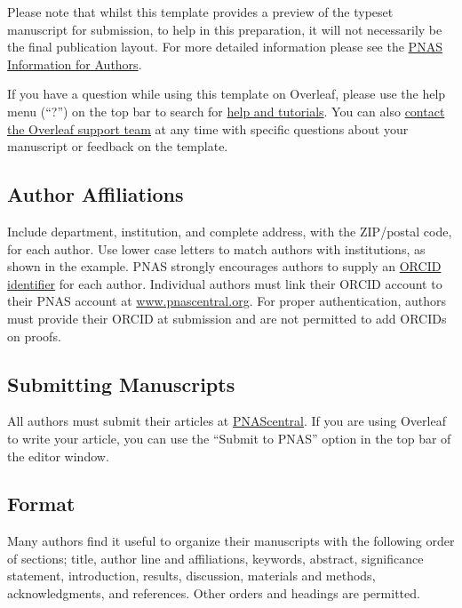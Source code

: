 \documentclass[9pt,twocolumn,twoside,lineno]{pnas-new}
\begin{document}
Please note that whilst this template provides a preview of the typeset manuscript for submission, to help in this preparation, it will not necessarily be the final publication layout. For more detailed information please see the \href{https://www.pnas.org/page/authors/format}{PNAS Information for Authors}.

If you have a question while using this template on Overleaf, please use the help menu (``?'') on the top bar to search for \href{https://www.overleaf.com/help}{help and tutorials}. You can also \href{https://www.overleaf.com/contact}{contact the Overleaf support team} at any time with specific questions about your manuscript or feedback on the template.

\subsection*{Author Affiliations}

Include department, institution, and complete address, with the ZIP/postal code, for each author. Use lower case letters to match authors with institutions, as shown in the example. PNAS strongly encourages authors to supply an \href{https://orcid.org/}{ORCID identifier} for each author. Individual authors must link their ORCID account to their PNAS account at \href{http://www.pnascentral.org/}{www.pnascentral.org}. For proper authentication, authors must provide their ORCID at submission and are not permitted to add ORCIDs on proofs.

\subsection*{Submitting Manuscripts}

All authors must submit their articles at \href{http://www.pnascentral.org/cgi-bin/main.plex}{PNAScentral}. If you are using Overleaf to write your article, you can use the ``Submit to PNAS'' option in the top bar of the editor window. 

\subsection*{Format}

Many authors find it useful to organize their manuscripts with the following order of sections;  title, author line and affiliations, keywords, abstract, significance statement, introduction, results, discussion, materials and methods, acknowledgments, and references. Other orders and headings are permitted.
\end{document}
